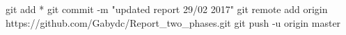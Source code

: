 git add *
git commit -m "updated report 29/02 2017"
git remote add origin https://github.com/Gabydc/Report_two_phases.git
git push -u origin master
